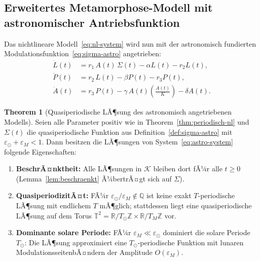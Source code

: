 ﻿\documentclass[12pt, a4paper]{article}
\theoremstyle{definition}
\newtheorem{theorem}{Theorem}[section]
\newcommand{\R}{\mathbb{R}}
\newcommand{\Z}{\mathbb{Z}}
\newcommand{\Q}{\mathbb{Q}}
\begin{document}
\subsection{Erweitertes Metamorphose-Modell mit astronomischer Antriebsfunktion}

Das nichtlineare Modell~\eqref{eq:nl-system} wird nun mit der astronomisch
fundierten Modulationsfunktion~\eqref{eq:sigma-astro} angetrieben:
\begin{subequations}\label{eq:astro-system}
\begin{align}
  \dot{L}(t) &= r_1\,A(t)\,\Sigma(t) - \alpha L(t) - r_2 L(t), \label{eq:astro-L}\\
  \dot{P}(t) &= r_2\,L(t) - \beta P(t) - r_3 P(t), \label{eq:astro-P}\\
  \dot{A}(t) &= r_3\,P(t) - \gamma\,A(t)\!\left(\frac{A(t)}{K}\right) - \delta A(t). \label{eq:astro-A}
\end{align}
\end{subequations}

\begin{theorem}[Quasiperiodische LÃ¶sung des astronomisch angetriebenen Modells]\label{thm:quasiperiodisch}
Seien alle Parameter positiv wie in Theorem~\ref{thm:periodisch-nl} und
$\Sigma(t)$ die quasiperiodische Funktion aus Definition~\ref{def:sigma-astro}
mit $\varepsilon_{\odot} + \varepsilon_M < 1$. Dann besitzen die LÃ¶sungen von
System~\eqref{eq:astro-system} folgende Eigenschaften:
\begin{enumerate}
  \item \textbf{BeschrÃ¤nktheit:} Alle LÃ¶sungen in $\mathcal{K}$ bleiben dort fÃ¼r
        alle $t \geq 0$ (Lemma~\ref{lem:beschraenkt} Ã¼bertrÃ¤gt sich auf $\Sigma$).
  \item \textbf{QuasiperiodizitÃ¤t:} FÃ¼r $\varepsilon_{\odot}/\varepsilon_M \notin \Q$
        ist keine exakt $T$-periodische LÃ¶sung mit endlichem $T$ mÃ¶glich;
        stattdessen liegt eine quasiperiodische LÃ¶sung auf dem Torus
        $\mathbb{T}^2 = \R/T_{\odot}\Z \times \R/T_M\Z$ vor.
  \item \textbf{Dominante solare Periode:} FÃ¼r $\varepsilon_M \ll \varepsilon_{\odot}$
        dominiert die solare Periode $T_{\odot}$: Die LÃ¶sung approximiert eine
        $T_{\odot}$-periodische Funktion mit lunaren ModulationsseitenbÃ¤ndern der
        Amplitude $O(\varepsilon_M)$.
\end{enumerate}
\end{theorem}
\end{document}
